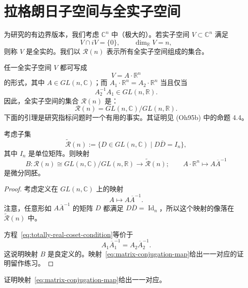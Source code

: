 \section{拉格朗日子空间与全实子空间}
\label{sec:lagrangian-versus-totally-real-subspaces}

为研究\termRiemannRochFormula{}的有边界版本，我们考虑 $\mathbb C^n$ 中（极大的）\emph{\termTotallyRealSubspace{}}。若实子空间 $V\subset\mathbb C^n$ 满足
\[
  V\cap iV=\{0\},
  \qquad
  \dim_{\mathbb R}V=n,
\]
则称 $V$ 是全实的。我们以 $\mathcal R(n)$ 表示所有全实子空间组成的集合。

任一全实子空间 $V$ 都可写成
\[
  V=A\cdot\mathbb R^n
\]
的形式，其中 $A\in GL(n,\mathbb C)$；而
$A_1\cdot\mathbb R^n=A_2\cdot\mathbb R^n$ 当且仅当
\begin{equation}
  A_2^{-1}A_1\in GL(n,\mathbb R).
\label{eq:totally-real-coset-condition}
\end{equation}
因此，全实子空间的集合 $\mathcal R(n)$ 是\termHomogeneousSpace{}：
\[
  \mathcal R(n)=GL(n,\mathbb C)/GL(n,\mathbb R).
\]
下面的引理是研究指标问题时一个有用的事实。其证明见 (Oh95b) 中的命题 4.4。

\begin{lemma}
\label{lem:totally-real-subspace-matrix-model}
考虑子集
\[
  \widetilde{\mathcal R}(n)
  :=\{D\in GL(n,\mathbb C)\mid D\overline D=I_n\},
\]
其中 $I_n$ 是单位矩阵。则映射
\[
  B:\mathcal R(n)\cong GL(n,\mathbb C)/GL(n,\mathbb R)
  \longrightarrow\widetilde{\mathcal R}(n);
  \qquad
  A\cdot\mathbb R^n\longmapsto A\overline A^{-1}
\]
是微分同胚。
\end{lemma}

\begin{proof}
考虑定义在 $GL(n,\mathbb C)$ 上的映射
\begin{equation}
  A\longmapsto A\overline A^{-1}.
\label{eq:matrix-conjugation-map}
\end{equation}
注意，任意形如 $A\overline A^{-1}$ 的矩阵 $D$ 都满足
$D\overline D=\operatorname{Id}_n$，所以这个映射的像落在
$\widetilde{\mathcal R}(n)$ 中。

方程~\eqref{eq:totally-real-coset-condition}等价于
\[
  A_1\overline A_1^{-1}=A_2\overline A_2^{-1}.
\]
这说明映射 $B$ 是良定义的。映射~\eqref{eq:matrix-conjugation-map}给出一一对应的证明留作练习。
\end{proof}

\begin{exercise}
\label{ex:matrix-conjugation-bijection}
证明映射~\eqref{eq:matrix-conjugation-map}给出一一对应。
\end{exercise}

